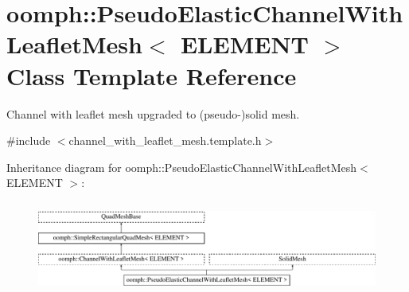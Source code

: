 \hypertarget{classoomph_1_1PseudoElasticChannelWithLeafletMesh}{}\section{oomph\+:\+:Pseudo\+Elastic\+Channel\+With\+Leaflet\+Mesh$<$ E\+L\+E\+M\+E\+NT $>$ Class Template Reference}
\label{classoomph_1_1PseudoElasticChannelWithLeafletMesh}


Channel with leaflet mesh upgraded to (pseudo-\/)solid mesh.  




{\ttfamily \#include $<$channel\+\_\+with\+\_\+leaflet\+\_\+mesh.\+template.\+h$>$}

Inheritance diagram for oomph\+:\+:Pseudo\+Elastic\+Channel\+With\+Leaflet\+Mesh$<$ E\+L\+E\+M\+E\+NT $>$\+:\begin{figure}[H]
\begin{center}
\leavevmode
\includegraphics[height=3.076923cm]{classoomph_1_1PseudoElasticChannelWithLeafletMesh}
\end{center}
\end{figure}

